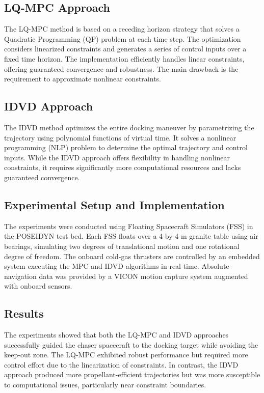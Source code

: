 \documentclass[a4paper,12pt]{article}
\begin{document}
    \subsection{LQ-MPC Approach}
        The LQ-MPC method is based on a receding horizon strategy that solves a Quadratic Programming (QP) problem at each time step. The optimization considers linearized constraints and generates a series of control inputs over a fixed time horizon. The implementation efficiently handles linear constraints, offering guaranteed convergence and robustness. The main drawback is the requirement to approximate nonlinear constraints.

    \subsection{IDVD Approach}
        The IDVD method optimizes the entire docking maneuver by parametrizing the trajectory using polynomial functions of virtual time. It solves a nonlinear programming (NLP) problem to determine the optimal trajectory and control inputs. While the IDVD approach offers flexibility in handling nonlinear constraints, it requires significantly more computational resources and lacks guaranteed convergence.

    \subsection{Experimental Setup and Implementation}
        The experiments were conducted using Floating Spacecraft Simulators (FSS) in the POSEIDYN test bed. Each FSS floats over a 4-by-4 m granite table using air bearings, simulating two degrees of translational motion and one rotational degree of freedom. The onboard cold-gas thrusters are controlled by an embedded system executing the MPC and IDVD algorithms in real-time. Absolute navigation data was provided by a VICON motion capture system augmented with onboard sensors.

    \subsection{Results}
        The experiments showed that both the LQ-MPC and IDVD approaches successfully guided the chaser spacecraft to the docking target while avoiding the keep-out zone. The LQ-MPC exhibited robust performance but required more control effort due to the linearization of constraints. In contrast, the IDVD approach produced more propellant-efficient trajectories but was more susceptible to computational issues, particularly near constraint boundaries.
\end{document}
